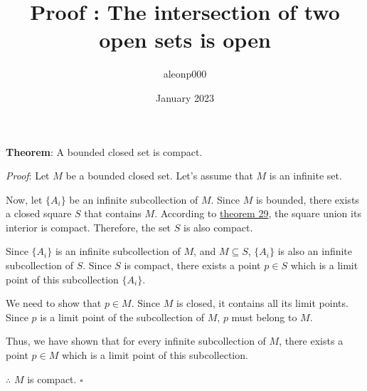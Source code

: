 \documentclass{article}
\title{Proof : The intersection of two open sets is open}
\author{aleonp000 }
\date{January 2023}
\begin{document}
\noindent
\textbf{Theorem}: A bounded closed set is compact.



\textit{Proof}:  Let $M$ be a bounded closed set. Let's assume that $M$ is an infinite set.

Now, let $\{A_i\}$ be an infinite subcollection of $M$. Since $M$ is bounded, there exists a closed square $S$ that contains $M$. According to \underline{theorem 29}, the square union its interior is compact. Therefore, the set $S$ is also compact.

Since $\{A_i\}$ is an infinite subcollection of $M$, and $M \subseteq S$, $\{A_i\}$ is also an infinite subcollection of $S$. Since $S$ is compact, there exists a point $p \in S$ which is a limit point of this subcollection $\{A_i\}$.

We need to show that $p \in M$. Since $M$ is closed, it contains all its limit points. Since $p$ is a limit point of the subcollection of $M$, $p$ must belong to $M$.

Thus, we have shown that for every infinite subcollection of $M$, there exists a point $p \in M$ which is a limit point of this subcollection.





 \noindent 
 $\therefore$   $M$ is compact.        \hfill                     $\square$
 
\end{document}
